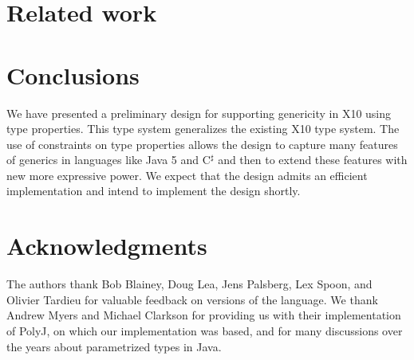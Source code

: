 \documentclass[preprint,nocopyrightspace,9pt]{sigplanconf}
\def\Xten{{\sf X10}}
\newcommand\csharp{C$^{\sharp}$\xspace}
\begin{document}
\section{Related work}
\label{sec:related}


\section{Conclusions}
\label{sec:conclusions}


We have presented a preliminary design for supporting genericity
in \Xten{} using type properties.  This type system generalizes the
existing \Xten{} type system.  The use of constraints on type
properties allows
the design to capture many features of generics in languages
like Java 5 and \csharp and then to extend these features with new
more expressive power.
We expect that the design admits an efficient
implementation and intend to implement the design shortly.

\section*{Acknowledgments} 

The authors thank Bob Blainey, 
Doug Lea, Jens Palsberg, Lex Spoon, and Olivier Tardieu
for valuable feedback on versions of the language.
We thank
Andrew Myers and
Michael Clarkson for providing us with their implementation of
PolyJ, on which our implementation was based, and for many
discussions over the years about parametrized types in Java.





% 
\end{document}
